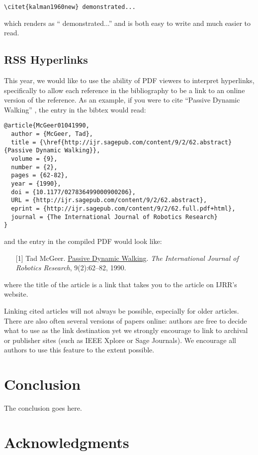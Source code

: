 \documentclass[conference]{IEEEtran}
\begin{document}
{\small
\begin{verbatim}
\citet{kalman1960new} demonstrated...
\end{verbatim}
}
\noindent
which renders as ``\citet{kalman1960new} demonstrated...'' and is
both easy to write and much easier to read.

\subsection{RSS Hyperlinks}

This year, we would like to use the ability of PDF viewers to interpret
hyperlinks, specifically to allow each reference in the bibliography to be a
link to an online version of the reference.
As an example, if you were to cite ``Passive Dynamic Walking''
\cite{McGeer01041990}, the entry in the bibtex would read:

{\small
\begin{verbatim}
@article{McGeer01041990,
  author = {McGeer, Tad},
  title = {\href{http://ijr.sagepub.com/content/9/2/62.abstract}{Passive Dynamic Walking}},
  volume = {9},
  number = {2},
  pages = {62-82},
  year = {1990},
  doi = {10.1177/027836499000900206},
  URL = {http://ijr.sagepub.com/content/9/2/62.abstract},
  eprint = {http://ijr.sagepub.com/content/9/2/62.full.pdf+html},
  journal = {The International Journal of Robotics Research}
}
\end{verbatim}
}
\noindent
and the entry in the compiled PDF would look like:

\def\tmplabel#1{[#1]}

\begin{enumerate}
\item[\tmplabel{1}] Tad McGeer. \href{http://ijr.sagepub.com/content/9/2/62.abstract}{Passive Dynamic
Walking}. {\em The International Journal of Robotics Research}, 9(2):62--82,
1990.
\end{enumerate}
%
where the title of the article is a link that takes you to the article on IJRR's website.


Linking cited articles will not always be possible, especially for
older articles. There are also often several versions of papers
online: authors are free to decide what to use as the link destination
yet we strongly encourage to link to archival or publisher sites
(such as IEEE Xplore or Sage Journals).  We encourage all authors to use this feature to
the extent possible.

\section{Conclusion}
\label{sec:conclusion}

The conclusion goes here.

\section*{Acknowledgments}




\end{document}
